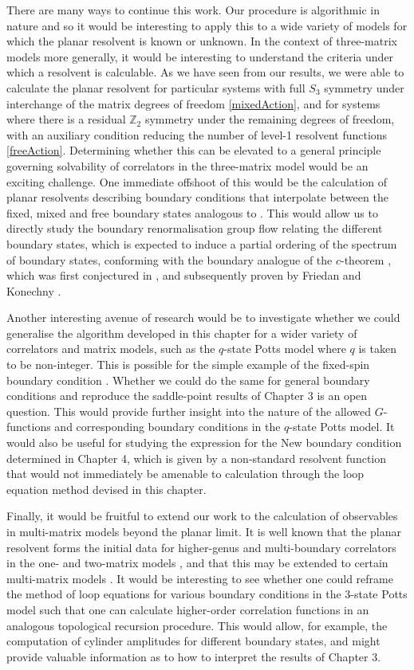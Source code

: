 There are many ways to continue this work. Our procedure is algorithmic in nature and so it would
be interesting to apply this to a wide variety of models for which the planar resolvent is known or
unknown. In the context of three-matrix models more generally, it would be interesting to
understand the criteria under which a resolvent is calculable. As we have seen from our results, we
were able to calculate the planar resolvent for particular systems with full $S_3$ symmetry under
interchange of the matrix degrees of freedom \eqref{mixedAction}, and for systems where there is a
residual $\mathbb{Z}_2$ symmetry under the remaining degrees of freedom, with an auxiliary
condition reducing the number of level-1 resolvent functions \eqref{freeAction}. Determining
whether this can be elevated to a general principle governing solvability of correlators in the
three-matrix model would be an exciting challenge. One immediate offshoot of this would be the
calculation of planar resolvents describing boundary conditions that interpolate between the fixed,
mixed and free boundary states analogous to \cite{Carroll:1997tr,Atkin:2012fx}. This would allow us
to directly study the boundary renormalisation group flow relating the different boundary states,
which is expected to induce a partial ordering of the spectrum of boundary states, conforming with
the boundary analogue of the $c$-theorem \cite{Zamolodchikov:1986gt}, which was first conjectured
in \cite{Affleck:1991tk}, and subsequently proven by Friedan and Konechny \cite{Friedan:2003yc}.

Another interesting avenue of research would be to investigate whether we could generalise the
algorithm developed in this chapter for a wider variety of correlators and matrix models, such as
the $q$-state Potts model where $q$ is taken to be non-integer. This is possible for the simple
example of the fixed-spin boundary condition \cite{Bonnet:1999nf}. Whether we could do the same for
general boundary conditions and reproduce the saddle-point results of Chapter 3 is an open
question. This would provide further insight into the nature of the allowed $G$-functions and
corresponding boundary conditions in the $q$-state Potts model. It would also be useful for
studying the expression for the New boundary condition determined in Chapter 4, which is given by a
non-standard resolvent function that would not immediately be amenable to calculation through the
loop equation method devised in this chapter.

Finally, it would be fruitful to extend our work to the calculation of observables in multi-matrix
models beyond the planar limit. It is well known that the planar resolvent forms the initial data
for higher-genus and multi-boundary correlators in the one- and two-matrix models
\cite{Eynard:2002kg,Eynard:2004mh,Eynard:2008we}, and that this may be extended to certain
multi-matrix models \cite{Borot:2009ia}. It would be interesting to see whether one could reframe
the method of loop equations for various boundary conditions in the 3-state Potts model such that
one can calculate higher-order correlation functions in an analogous topological recursion
procedure. This would allow, for example, the computation of cylinder amplitudes for different
boundary states, and might provide valuable information as to how to interpret the results of
Chapter 3.